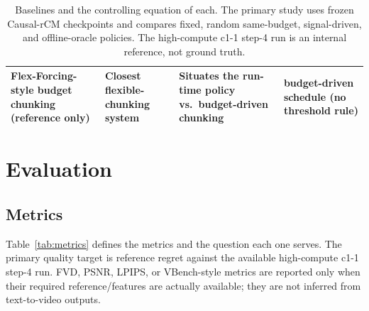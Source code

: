 \documentclass[11pt,a4paper]{article}
\begin{document}
\begin{table}[t]
\begin{tabularx}{\textwidth}{>{\raggedright\arraybackslash}p{3.4cm} >{\raggedright\arraybackslash}X >{\raggedright\arraybackslash}X >{\raggedright\arraybackslash}p{3.0cm}}
Flex-Forcing-style budget chunking (reference only) & Closest flexible-chunking system & Situates the run-time policy vs.\ budget-driven chunking & budget-driven schedule (no threshold rule) \\
\bottomrule
\end{tabularx}
\caption{Baselines and the controlling equation of each. The primary study uses frozen Causal-rCM checkpoints and compares fixed, random same-budget, signal-driven, and offline-oracle policies. The high-compute c1-1 step-4 run is an internal reference, not ground truth.}
\label{tab:baselines}
\end{table}
\FloatBarrier

\section{Evaluation}\label{sec:evaluation}

\subsection{Metrics}

Table~\ref{tab:metrics} defines the metrics and the question each one serves. The primary quality target is reference regret against the available high-compute c1-1 step-4 run. FVD, PSNR, LPIPS, or VBench-style metrics are reported only when their required reference/features are actually available; they are not inferred from text-to-video outputs.
\end{document}
